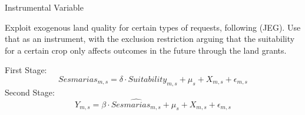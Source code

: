 \documentclass[aspectratio=1610]{beamer}
\begin{document}
\begin{frame}{Instrumental Variable}
    \begin{outline}
        \1 Exploit exogenous land quality for certain types of requests, following \cite{Wigton-Jones2020-ex} (JEG). Use that as an instrument, with the exclusion restriction arguing that the suitability for a certain crop only affects outcomes in the future through the land grants.
    \end{outline}
    \vspace{3mm}
    First Stage:
    $$ Sesmarias_{m,s} = \delta \cdot Suitability_{m,s} + \mu_s + X_{m,s} + \epsilon_{m,s} $$
    Second Stage:
    $$ Y_{m,s} = \beta \cdot \widehat{Sesmarias_{m,s}} + \mu_s + X_{m,s} + \epsilon_{m,s}$$
\end{frame}


\end{document}
